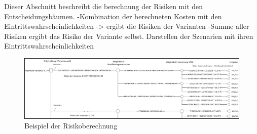 %
%
%
%

\label{subsec:BerechnungRisiken}

Dieser Abschnitt beschreibt die berechnung der Risiken mit den Entscheidungsbäumen.
-Kombination der berechneten Kosten mit den Eintrittswahrscheinlichkeiten -> ergibt die Risiken der Varianten
-Summe aller Risiken ergibt das Risiko der Variante selbst.
Darstellen der Szenarien mit ihren Eintrittswahrscheinlichkeiten

\begin{figure}[h!]
	\centering
	\includegraphics[width=\textwidth]{figures/04-08-01-Risikoberechnung}
	\caption[Risikoberechnung]{Beispiel der Risikoberechnung}
	\label{img:Risikoberechnung}
\end{figure}




%

